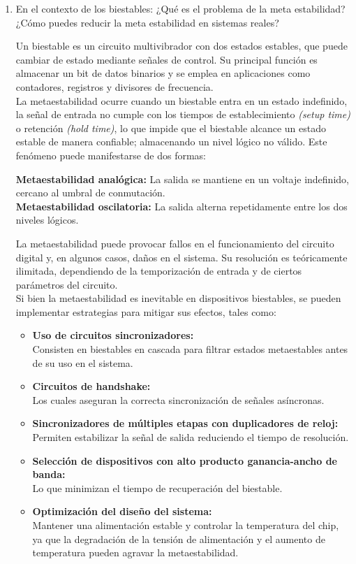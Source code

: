 \documentclass[12pt,letterpaper]{article}
\begin{document}
\begin{enumerate}
\item En el contexto de los biestables: ¿Qué es el problema de la meta estabilidad? ¿Cómo puedes reducir la meta estabilidad en sistemas reales?
  \bigskip
  
  Un biestable es un circuito multivibrador con dos estados estables, que puede cambiar de estado mediante señales de control. Su principal función es almacenar un bit de datos binarios y se emplea en aplicaciones como contadores, registros y divisores de frecuencia.\\
  La metaestabilidad ocurre cuando un biestable entra en un estado indefinido, la señal de entrada no cumple con los tiempos de establecimiento \textit{(setup time)} o retención \textit{(hold time)}, lo que impide que el biestable alcance un estado estable de manera confiable; almacenando un nivel lógico no válido. Este fenómeno puede manifestarse de dos formas:
  
  \textbf{Metaestabilidad analógica:} La salida se mantiene en un voltaje indefinido, cercano al umbral de conmutación.\\
  \textbf{Metaestabilidad oscilatoria:} La salida alterna repetidamente entre los dos niveles lógicos.
  
  La metaestabilidad puede provocar fallos en el funcionamiento del circuito digital y, en algunos casos, daños en el sistema. Su resolución es teóricamente ilimitada, dependiendo de la temporización de entrada y de ciertos parámetros del circuito.\\
  Si bien la metaestabilidad es inevitable en dispositivos biestables, se pueden implementar estrategias para mitigar sus efectos, tales como:

  \begin{itemize}
  \item \textbf{Uso de circuitos sincronizadores:}\\
    Consisten en biestables en cascada para filtrar estados metaestables antes de su uso en el sistema.
  \item \textbf{Circuitos de handshake:}\\
    Los cuales aseguran la correcta sincronización de señales asíncronas.
  \item \textbf{Sincronizadores de múltiples etapas con duplicadores de reloj:}\\
    Permiten estabilizar la señal de salida reduciendo el tiempo de resolución.
  \item \textbf{Selección de dispositivos con alto producto ganancia-ancho de banda:} \\
    Lo que minimizan el tiempo de recuperación del biestable.
  \item \textbf{Optimización del diseño del sistema:}\\
    Mantener una alimentación estable y controlar la temperatura del chip, ya que la degradación de la tensión de alimentación y el aumento de temperatura pueden agravar la metaestabilidad.
  \end{itemize}
  

\end{enumerate}
\end{document}
